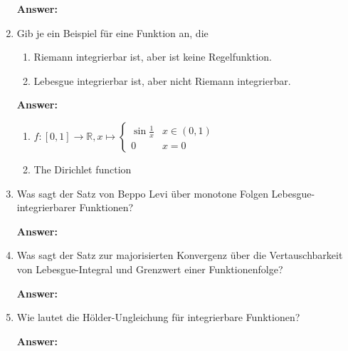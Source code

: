 \documentclass[11pt]{article}
\newcommand{\RR}[0]{\mathbb{R}}
\begin{document}
\begin{enumerate}
    \textbf{Answer:}

    \item Gib je ein Beispiel für eine Funktion an, die
    \begin{enumerate}
        \item Riemann integrierbar ist, aber ist keine Regelfunktion.
        \item Lebesgue integrierbar ist, aber nicht Riemann integrierbar.
    \end{enumerate}

    \textbf{Answer:}
    \begin{enumerate}
        \item $f\colon [0, 1] \to \RR, x \mapsto \begin{cases}
            \sin{\frac{1}{x}}&x \in (0, 1)\\
            0&x=0
        \end{cases}$
        \item The Dirichlet function
    \end{enumerate}

    \item Was sagt der Satz von Beppo Levi über monotone Folgen Lebesgue-integrierbarer Funktionen?

    \textbf{Answer:}
    \item Was sagt der Satz zur majorisierten Konvergenz über die Vertauschbarkeit von Lebesgue-Integral und Grenzwert einer Funktionenfolge?

    \textbf{Answer:}
    \item Wie lautet die Hölder-Ungleichung für integrierbare Funktionen?

    \textbf{Answer:}
\end{enumerate}
\end{document}
